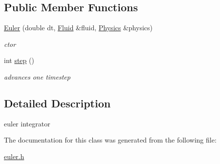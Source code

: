 \subsection*{\-Public \-Member \-Functions}
\begin{DoxyCompactItemize}
\item 
\hypertarget{classEuler_abae73a2536cea422aab8e6d637b766d7}{\hyperlink{classEuler_abae73a2536cea422aab8e6d637b766d7}{\-Euler} (double dt, \hyperlink{classFluid}{\-Fluid} \&fluid, \hyperlink{classPhysics}{\-Physics} \&physics)}\label{classEuler_abae73a2536cea422aab8e6d637b766d7}

\begin{DoxyCompactList}\small\item\em ctor \end{DoxyCompactList}\item 
\hypertarget{classEuler_a343d589f62a1073886e76c82e0689aed}{int \hyperlink{classEuler_a343d589f62a1073886e76c82e0689aed}{step} ()}\label{classEuler_a343d589f62a1073886e76c82e0689aed}

\begin{DoxyCompactList}\small\item\em advances one timestep \end{DoxyCompactList}\end{DoxyCompactItemize}


\subsection{\-Detailed \-Description}
euler integrator 

\-The documentation for this class was generated from the following file\-:\begin{DoxyCompactItemize}
\item 
\hyperlink{euler_8h}{euler.\-h}\end{DoxyCompactItemize}

